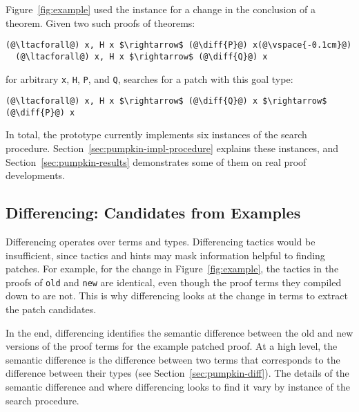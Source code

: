 Figure~\ref{fig:example} used the instance for a change in the conclusion of a theorem.
Given two such proofs of theorems:

\begin{lstlisting}[language=coq]
  (@\ltacforall@) x, H x $\rightarrow$ (@\diff{P}@) x(@\vspace{-0.1cm}@)
  (@\ltacforall@) x, H x $\rightarrow$ (@\diff{Q}@) x
\end{lstlisting}
for arbitrary \lstinline{x}, \lstinline{H}, \lstinline{P}, and \lstinline{Q},
\sysname searches for a patch with this goal type:

\begin{lstlisting}[language=coq]
  (@\ltacforall@) x, H x $\rightarrow$ (@\diff{Q}@) x $\rightarrow$ (@\diff{P}@) x
\end{lstlisting}

In total, the \sysname prototype currently implements six instances of the search procedure.
Section~\ref{sec:pumpkin-impl-procedure} explains these instances,
and Section~\ref{sec:pumpkin-results} demonstrates some of them on real proof developments.

\subsection{Differencing: Candidates from Examples}
\label{sec:pumpkin-spec-diff}

Differencing operates over terms and types. Differencing tactics
would be insufficient, since tactics and hints may mask information helpful to finding patches.
For example, for the change in Figure~\ref{fig:example},
the tactics in the proofs of \lstinline{old} and \lstinline{new} are identical, even 
though the proof terms they compiled down to are not. %
This is why differencing looks at the change in terms to extract the patch candidates.

In the end, differencing identifies the semantic difference between the old and new versions of the proof terms for the example patched proof.
At a high level, the semantic difference is the difference between two terms that corresponds to the 
difference between their types (see Section~\ref{sec:pumpkin-diff}).
The details of the semantic difference and where differencing looks to find it vary by instance of the search procedure.

